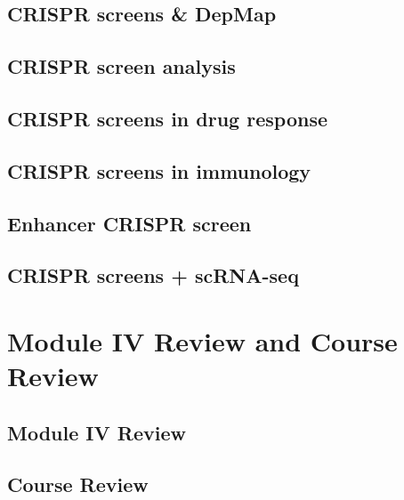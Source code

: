 \documentclass[
]{book}
\begin{document}
\hypertarget{crispr-screens-depmap}{%
\section{CRISPR screens \& DepMap}\label{crispr-screens-depmap}}

\hypertarget{crispr-screen-analysis}{%
\section{CRISPR screen analysis}\label{crispr-screen-analysis}}

\hypertarget{crispr-screens-in-drug-response}{%
\section{CRISPR screens in drug response}\label{crispr-screens-in-drug-response}}

\hypertarget{crispr-screens-in-immunology}{%
\section{CRISPR screens in immunology}\label{crispr-screens-in-immunology}}

\hypertarget{enhancer-crispr-screen}{%
\section{Enhancer CRISPR screen}\label{enhancer-crispr-screen}}

\hypertarget{crispr-screens-scrna-seq}{%
\section{CRISPR screens + scRNA-seq}\label{crispr-screens-scrna-seq}}

\hypertarget{m4re}{%
\chapter{Module IV Review and Course Review}\label{m4re}}

\hypertarget{module-iv-review}{%
\section{Module IV Review}\label{module-iv-review}}

\hypertarget{course-review}{%
\section{Course Review}\label{course-review}}
\end{document}

